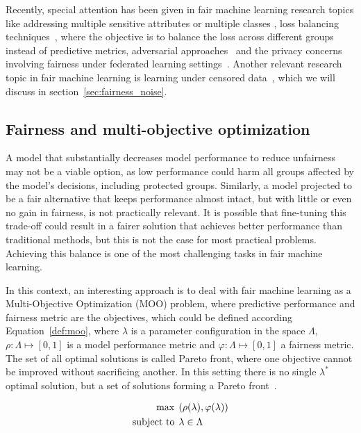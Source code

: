 Recently, special attention has been given in fair machine learning research topics like addressing multiple sensitive attributes or multiple classes \cite{DAloisio2023,Liu_Wang_Wang_Wang_Su_Gao_2023}, loss balancing techniques~\cite{KIM2023231,KhaliliZA23}, where the objective is to balance the loss across different groups instead of predictive metrics, adversarial approaches~\cite{Liang2023,ZhangZLZY23,GrariLD23,MousaviMD23,Zeming2023,Yuchen2023} and the privacy concerns involving fairness under federated learning settings~\cite{ChenZZZY24,VucinichZ23}. Another relevant research topic in fair machine learning is learning under censored data~\cite{WZhang2022,WZhang2023_a,WZhang2023_b,WZhang2023_c}, which we will discuss in section~\ref{sec:fairness_noise}.


\subsection{Fairness and multi-objective optimization}

A model that substantially decreases model performance to reduce unfairness may not be a viable option, as low performance could harm all groups affected by the model's decisions, including protected groups. Similarly, a model projected to be a fair alternative that keeps performance almost intact, but with little or even no gain in fairness, is not practically relevant. It is possible that fine-tuning this trade-off could result in a fairer solution that achieves better performance than traditional methods, but this is not the case for most practical problems. Achieving this balance is one of the most challenging tasks in fair machine learning.

In this context, an interesting approach is to deal with fair machine learning as a Multi-Objective Optimization (MOO) problem, where predictive performance and fairness metric are the objectives, which could be defined according Equation~\ref{def:moo}, where $\lambda$ is a parameter configuration in the space $\Lambda$, $\rho: \Lambda \mapsto [0,1]$ is a model performance metric and $\varphi: \Lambda \mapsto [0,1]$ a fairness metric. The set of all optimal solutions is called Pareto front, where one objective cannot be improved without sacrificing another. In this setting there is no single $\lambda^*$ optimal solution, but a set of solutions forming a Pareto front~\citep{pareto1906manuale}.

\begin{align}\label{def:moo}
\max &\hspace{1ex} (\rho(\lambda), \varphi(\lambda)) \\
\text{subject to} &\hspace{1ex} \lambda\in\Lambda \nonumber
\end{align}

